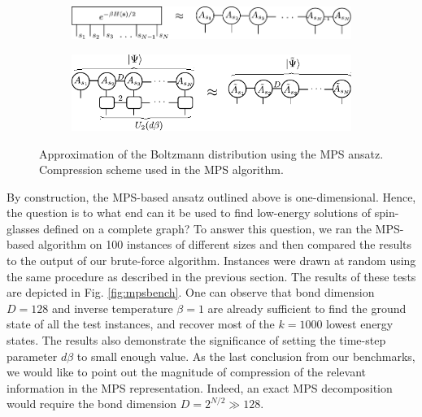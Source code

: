 \begin{figure}
  \begin{subfigure}[t]{0.45\textwidth}
    \caption{}\label{fig:mps:boltzmann}
    \includegraphics[width=\textwidth]{figures/mps}
  \end{subfigure}\hfill
  \begin{subfigure}[t]{0.45\textwidth}
    \caption{}\label{fig:mps:compress}
    \includegraphics[width=\textwidth]{figures/mps_compress}
  \end{subfigure}
  \caption{ Approximation of the Boltzmann distribution using the MPS ansatz.  Compression scheme used in the MPS algorithm.}
  \label{fig:mps}
\end{figure}

By construction, the MPS-based ansatz outlined above is one-dimensional. Hence,
the question is to what end can it be used to find low-energy solutions of
spin-glasses defined on a complete graph? To answer this question, we ran the
MPS-based algorithm on 100 instances of different sizes and then compared the
results to the output of our brute-force algorithm. Instances were drawn at
random using the same procedure as described in the previous section. The
results of these tests are depicted in Fig. \ref{fig:mpsbench}. One can observe
that bond dimension $D=128$ and inverse temperature $\beta=1$ are already
sufficient to find the ground state of all the test instances, and recover most
of the $k=1000$ lowest energy states. The results also demonstrate the
significance of setting the time-step parameter $d\beta$ to small enough value.
As the last conclusion from our benchmarks, we would like to point out the
magnitude of compression of the relevant information in the MPS representation.
Indeed, an exact MPS decomposition would require the bond dimension $D=2^{N/2}
  \gg 128$.

